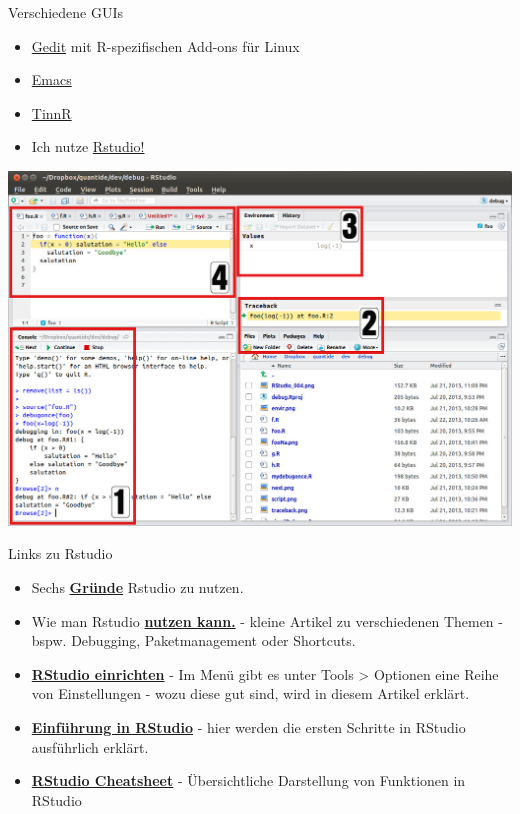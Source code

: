\documentclass[ignorenonframetext,]{beamer}
\begin{document}
\begin{frame}{Verschiedene GUIs}

\begin{itemize}
\item
  \href{https://projects.gnome.org/gedit/}{Gedit} mit R-spezifischen
  Add-ons für Linux
\item
  \href{http://www.gnu.org/software/emacs/}{Emacs}
\item
  \href{http://www.sciviews.org/Tinn-R/}{TinnR}
\item
  Ich nutze \href{https://www.rstudio.com/}{Rstudio!}
\end{itemize}

\includegraphics{figure/0_overall.jpg}

\end{frame}

\begin{frame}{Links zu Rstudio}

\begin{itemize}
\item
  Sechs
  \href{http://www.r-bloggers.com/top-6-reasons-you-need-to-be-using-rstudio/}{\textbf{Gründe}}
  Rstudio zu nutzen.
\item
  Wie man Rstudio
  \href{https://support.rstudio.com/hc/en-us/sections/200107586-Using-RStudio}{\textbf{nutzen
  kann.}} - kleine Artikel zu verschiedenen Themen - bspw. Debugging,
  Paketmanagement oder Shortcuts.
\item
  \href{https://support.rstudio.com/hc/en-us/articles/200549016-Customizing-RStudio}{\textbf{RStudio
  einrichten}} - Im Menü gibt es unter Tools \textgreater{} Optionen
  eine Reihe von Einstellungen - wozu diese gut sind, wird in diesem
  Artikel erklärt.
\item
  \href{https://dss.princeton.edu/training/RStudio101.pdf}{\textbf{Einführung
  in RStudio}} - hier werden die ersten Schritte in RStudio ausführlich
  erklärt. 
\item
  \href{https://github.com/rstudio/cheatsheets/raw/master/rstudio-ide.pdf}{\textbf{RStudio
  Cheatsheet}} - Übersichtliche Darstellung von Funktionen in RStudio
\end{itemize}

\end{frame}
\end{document}
